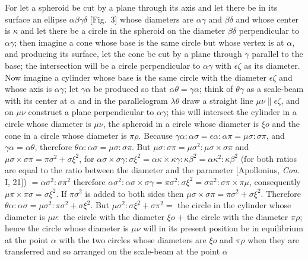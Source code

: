 \documentclass[12pt]{article}
\begin{document}
For let a spheroid be cut by a plane through its axis and let there be
in its surface an ellipse $\alpha\beta\gamma\delta$ [Fig.~3] whose
diameters are $\alpha\gamma$ and $\beta\delta$ and whose center is
$\kappa$ and let there be a circle in the spheroid on the diameter
$\beta\delta$ perpendicular to $\alpha\gamma$; then imagine a cone
whose base is the same circle but whose vertex is at $\alpha$, and
producing its surface, let the cone be cut by a plane through $\gamma$
parallel to the base; the intersection will be a circle perpendicular
to $\alpha\gamma$ with $\epsilon\zeta$ as its diameter. Now imagine a
cylinder whose base is the same circle with the diameter
$\epsilon\zeta$ and whose axis is $\alpha\gamma$; let $\gamma\alpha$
be produced so that $\alpha\theta = \gamma\alpha$; think of
$\theta\gamma$ as a scale-beam with its center at $\alpha$ and in the
parallelogram $\lambda\theta$ draw a straight line $\mu\nu \|
\epsilon\zeta$, and on $\mu\nu$ construct a plane perpendicular to
$\alpha\gamma$; this will intersect the cylinder in a circle whose
diameter is $\mu\nu$, the spheroid in a circle whose diameter is $\xi
o$ and the cone in a circle whose diameter is $\pi\rho$. Because
$\gamma\alpha : \alpha\sigma = \epsilon\alpha : \alpha\pi = \mu\sigma
: \sigma\pi$, and $\gamma\alpha = \alpha\theta$, therefore
$\theta\alpha : \alpha\sigma = \mu\sigma : \sigma\pi$. But $\mu\sigma
: \sigma\pi = \mu\sigma^2 : \mu\sigma \times \sigma\pi$ and $\mu\sigma
\times \sigma\pi = \pi\sigma^2 + \sigma\xi^2$, for $ \alpha\sigma
\times \sigma\gamma : \sigma\xi^2 = \alpha\kappa \times \kappa\gamma :
\kappa\beta^2 = \alpha\kappa^2 : \kappa\beta^2$ (for both ratios are
equal to the ratio between the diameter and the parameter [Apollonius,
\emph{Con.} I, 21]) $ = \alpha\sigma^2 : \sigma\pi^2$ therefore
$\alpha\sigma^2 : \alpha\sigma \times \sigma\gamma = \pi\sigma^2 :
\sigma\xi^2 = \sigma\pi^2 : \sigma\pi \times \pi\mu$, consequently
$\mu\pi \times \pi\sigma = \sigma\xi^2$. If $\pi\sigma^2$ is added to
both sides then $\mu\sigma \times \sigma\pi = \pi\sigma^2 +
\sigma\xi^2$. Therefore $\theta\alpha : \alpha\sigma = \mu\sigma^2 :
\pi\sigma^2 + \sigma\xi^2$. But $\mu\sigma^2 : \sigma\xi^2 +
\sigma\pi^2 =$ the circle in the cylinder whose diameter is $\mu\nu :$
the circle with the diameter $\xi o$ + the circle with the diameter
$\pi\rho$; hence the circle whose diameter is $\mu\nu$ will in its
present position be in equilibrium at the point $\alpha$ with the two
circles whose diameters are $\xi o$ and $\pi\rho$ when they are
transferred and so arranged on the scale-beam at the point $\alpha$
\end{document}
